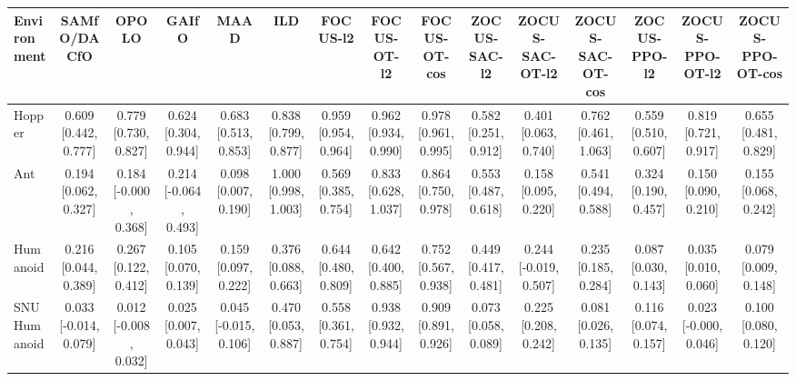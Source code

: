 \begin{tabular}{lcccccccccccccc}
\toprule
Environment & SAMfO/DACfO & OPOLO & GAIfO & MAAD & ILD & FOCUS-l2 & FOCUS-OT-l2 & FOCUS-OT-cos & ZOCUS-SAC-l2 & ZOCUS-SAC-OT-l2 & ZOCUS-SAC-OT-cos & ZOCUS-PPO-l2 & ZOCUS-PPO-OT-l2 & ZOCUS-PPO-OT-cos \\
\midrule
Hopper & 0.609 [0.442, 0.777] & 0.779 [0.730, 0.827] & 0.624 [0.304, 0.944] & 0.683 [0.513, 0.853] & 0.838 [0.799, 0.877] & 0.959 [0.954, 0.964] & 0.962 [0.934, 0.990] & 0.978 [0.961, 0.995] & 0.582 [0.251, 0.912] & 0.401 [0.063, 0.740] & 0.762 [0.461, 1.063] & 0.559 [0.510, 0.607] & 0.819 [0.721, 0.917] & 0.655 [0.481, 0.829] \\
Ant & 0.194 [0.062, 0.327] & 0.184 [-0.000, 0.368] & 0.214 [-0.064, 0.493] & 0.098 [0.007, 0.190] & 1.000 [0.998, 1.003] & 0.569 [0.385, 0.754] & 0.833 [0.628, 1.037] & 0.864 [0.750, 0.978] & 0.553 [0.487, 0.618] & 0.158 [0.095, 0.220] & 0.541 [0.494, 0.588] & 0.324 [0.190, 0.457] & 0.150 [0.090, 0.210] & 0.155 [0.068, 0.242] \\
Humanoid & 0.216 [0.044, 0.389] & 0.267 [0.122, 0.412] & 0.105 [0.070, 0.139] & 0.159 [0.097, 0.222] & 0.376 [0.088, 0.663] & 0.644 [0.480, 0.809] & 0.642 [0.400, 0.885] & 0.752 [0.567, 0.938] & 0.449 [0.417, 0.481] & 0.244 [-0.019, 0.507] & 0.235 [0.185, 0.284] & 0.087 [0.030, 0.143] & 0.035 [0.010, 0.060] & 0.079 [0.009, 0.148] \\
SNU Humanoid & 0.033 [-0.014, 0.079] & 0.012 [-0.008, 0.032] & 0.025 [0.007, 0.043] & 0.045 [-0.015, 0.106] & 0.470 [0.053, 0.887] & 0.558 [0.361, 0.754] & 0.938 [0.932, 0.944] & 0.909 [0.891, 0.926] & 0.073 [0.058, 0.089] & 0.225 [0.208, 0.242] & 0.081 [0.026, 0.135] & 0.116 [0.074, 0.157] & 0.023 [-0.000, 0.046] & 0.100 [0.080, 0.120] \\
\bottomrule
\end{tabular}
